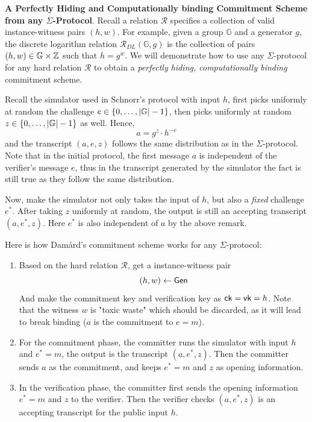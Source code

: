 \documentclass{article}
\begin{document}
\textbf{A Perfectly Hiding and Computationally binding Commitment Scheme from any $\Sigma$-Protocol}. Recall a relation $\mathcal{R}$ specifies a collection of valid instance-witness pairs $(h, w)$. For example, given a group $\mathbb{G}$ and a generator $g$, the discrete logarithm relation $\mathcal{R}_{DL}(\mathbb{G}, g)$ is the collection of pairs $(h, w) \in \mathbb{G} \times \mathbb{Z}$ such that $h = g^w$. We will demonstrate how to use any $\Sigma$-protocol for any hard relation $\mathcal{R}$ to obtain a \textit{perfectly hiding, computationally binding} commitment scheme. \label{sec:pedersen-commitment}

Recall the simulator used in Schnorr's protocol with input $h$, first picks uniformly at random the challenge $e \in \left\{ 0, \dots, \abs{\mathbb{G}} - 1 \right\}$, then picks uniformly at random $z \in \left\{ 0, \dots, \abs{\mathbb{G}} - 1 \right\}$ as well. Hence, 
\begin{equation*}
a = g^z \cdot h^{-e}
\end{equation*}
and the transcript $(a, e, z)$ follows the same distribution as in the $\Sigma$-protocol. Note that in the initial protocol, the first message $a$ is independent of the verifier's message $e$, thus in the transcript generated by the simulator the fact is still true as they follow the same distribution. 

Now, make the simulator not only takes the input of $h$, but also a \textit{fixed} challenge $e^{\displaystyle *}$. After taking $z$ uniformly at random, the output is still an accepting transcript $(a, e^{\displaystyle *}, z)$. Here $e^{\displaystyle *}$ is also independent of $a$ by the above remark. 

Here is how Dam\aa rd's commitment scheme works for any $\Sigma$-protocol: 
\begin{enumerate}
\item\label{item:35} Based on the hard relation $\mathcal{R}$, get a instance-witness pair
\begin{equation*}
(h, w) \leftarrow \text{\textsf{Gen}}
\end{equation*}
And make the commitment key and verification key as $\text{\textsf{ck}} = \text{\textsf{vk}} = h$. Note that the witness $w$ is "toxic waste" which should be discarded, as it will lead to break binding ($a$ is the commitment to $e = m$). 
\item\label{item:36} For the commitment phase, the committer runs the simulator with input $h$ and $e^{\displaystyle *} = m$, the output is the transcript $(a, e^{\displaystyle *}, z)$. Then the committer sends $a$ as the commitment, and keeps $e^{\displaystyle *} = m$ and $z$ as opening information. 
\item\label{item:37} In the verification phase, the committer first sends the opening information $e^{\displaystyle *} = m$ and $z$ to the verifier. Then the verifier checks $(a, e^{\displaystyle *}, z)$ is an accepting transcript for the public input $h$. 
\end{enumerate}
\end{document}
